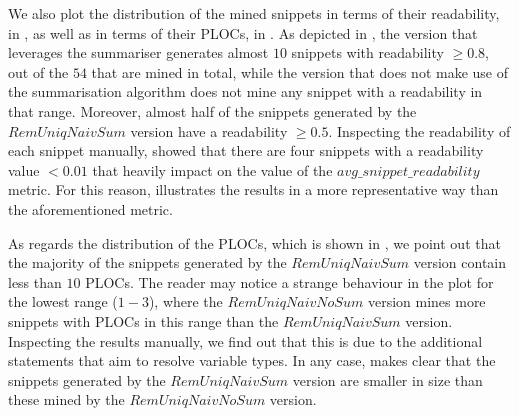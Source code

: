 We also plot the distribution of the mined snippets in terms of their readability, in , as well as in terms of their PLOCs, in . As depicted in , the version that leverages the summariser generates almost $10$ snippets with readability $\geq 0.8$, out of the $54$ that are mined in total, while the version that does not make use of the summarisation algorithm does not mine any snippet with a readability in that range. Moreover, almost half of the snippets generated by the $RemUniqNaivSum$ version have a readability $\geq 0.5$. Inspecting the readability of each snippet manually, showed that there are four snippets with a readability value $<0.01$ that heavily impact on the value of the $avg\_snippet\_readability$ metric. For this reason,  illustrates the results in a more representative way than the aforementioned metric.

As regards the distribution of the PLOCs, which is shown in , we point out that the majority of the snippets generated by the $RemUniqNaivSum$ version contain less than $10$ PLOCs. The reader may notice a strange behaviour in the plot for the lowest range ($1-3$), where the $RemUniqNaivNoSum$ version mines more snippets with PLOCs in this range than the $RemUniqNaivSum$ version. Inspecting the results manually, we find out that this is due to the additional statements that aim to resolve variable types. In any case,  makes clear that the snippets generated by the $RemUniqNaivSum$ version are smaller in size than these mined by the $RemUniqNaivNoSum$ version.

